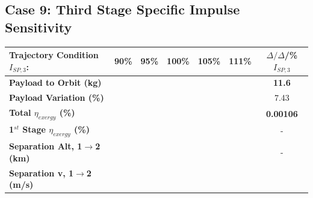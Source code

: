 \subsection{Case 9: Third Stage Specific Impulse Sensitivity}\label{sec:isp3NoReturn}

\begin{table}[ht] %

	\centering
	\begin{tabular}{l c c c c c c} 
		\hline \textbf{Trajectory Condition}   \qquad  $I_{SP,3}$:
		&90\%
		&95\%
		&100\%
		&105\%
		&111\%
		& $\Delta/\Delta$/\%$I_{SP,3}$
		\\
		\hline \textbf{Payload to Orbit (kg)}
		& \textbf{\PayloadToOrbitISPThreeNinetyNoReturn}
		& \textbf{\PayloadToOrbitISPThreeNinetyFiveNoReturn}
		& \textbf{\PayloadToOrbitISPThreeStandardNoReturn}
		& \textbf{\PayloadToOrbitISPThreeOneHundredFiveNoReturn}
		& \textbf{\PayloadToOrbitISPThreeOneHundredTenNoReturn}
		&\textbf{11.6}
		\\
		\textbf{Payload Variation (\%)}
		& \PayloadVarISPThreeNinetyNoReturn
		& \PayloadVarISPThreeNinetyFiveNoReturn
		& \PayloadVarISPThreeStandardNoReturn
		& \PayloadVarISPThreeOneHundredFiveNoReturn
		& \PayloadVarISPThreeOneHundredTenNoReturn
		&7.43
		\\
		\textbf{Total $\eta_{exergy}$ (\%)}
		& \textbf{\totalExergyEffISPThreeNinetyNoReturn}
		& \textbf{\totalExergyEffISPThreeNinetyFiveNoReturn}
		& \textbf{\totalExergyEffISPThreeStandardNoReturn}
		& \textbf{\totalExergyEffISPThreeOneHundredFiveNoReturn}
		& \textbf{\totalExergyEffISPThreeOneHundredTenNoReturn}
		& \textbf{0.00106}
		\\
		\hline 
		\textbf{1$^{st}$ Stage $\eta_{exergy}$ (\%)}
		& \textbf{\firstExergyEffISPThreeNinetyNoReturn}
		& \textbf{\firstExergyEffISPThreeNinetyFiveNoReturn}
		& \textbf{\firstExergyEffISPThreeStandardNoReturn}
		& \textbf{\firstExergyEffISPThreeOneHundredFiveNoReturn}
		& \textbf{\firstExergyEffISPThreeOneHundredTenNoReturn}
		& -
		\\
		\textbf{Separation Alt, 1$\rightarrow$2 (km)}
		& \firstsecondSeparationAltISPThreeNinetyNoReturn
		& \firstsecondSeparationAltISPThreeNinetyFiveNoReturn
		& \firstsecondSeparationAltISPThreeStandardNoReturn
		& \firstsecondSeparationAltISPThreeOneHundredFiveNoReturn
		& \firstsecondSeparationAltISPThreeOneHundredTenNoReturn
		& -
		\\
		\textbf{Separation v, 1$\rightarrow$2 (m/s)}
		& \firstsecondSeparationvISPThreeNinetyNoReturn
		& \firstsecondSeparationvISPThreeNinetyFiveNoReturn

\end{tabular}
\end{table}
